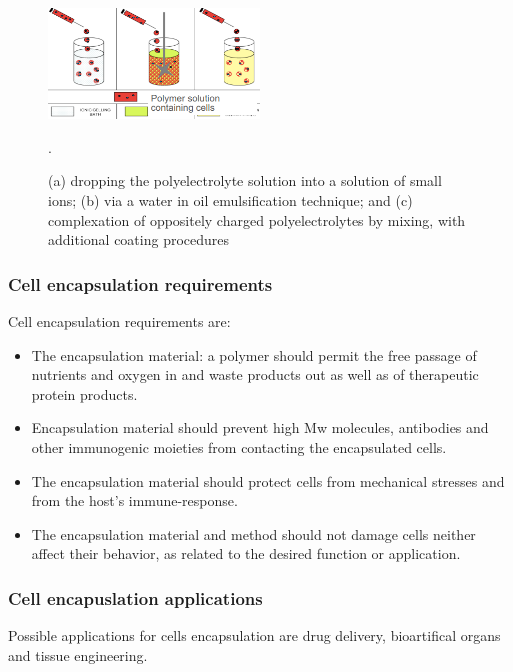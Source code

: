     \begin{figure}[H]
            \centering
            \includegraphics[width=0.5\textwidth]{encapsulation.png}
            \caption{\label{fig:encapsulation} (a) dropping the polyelectrolyte solution into a solution of small ions; (b) via a water in oil emulsification technique; and (c) complexation of oppositely charged polyelectrolytes by mixing, with additional coating procedures}.
    \end{figure}

        \subsubsection{Cell encapsulation requirements}
        Cell encapsulation requirements are:

        \begin{multicols}{2}
            \begin{itemize}
                \item The encapsulation material: a polymer should permit the free passage of nutrients and oxygen in and waste products out as well as of therapeutic protein products.
                \item Encapsulation material should prevent high Mw molecules, antibodies and other immunogenic moieties from contacting the encapsulated cells.
                \item The encapsulation material should protect cells from mechanical stresses and from the host's immune-response.
                \item The encapsulation material and method should not damage cells neither affect their behavior, as related to the desired function or application.
            \end{itemize}
        \end{multicols}

        \subsubsection{Cell encapuslation applications}
        Possible applications for cells encapsulation are drug delivery, bioartifical organs and tissue engineering.

